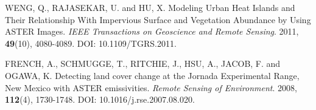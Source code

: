 \begin{thebibliography}{10}
 WENG, Q., RAJASEKAR, U. and HU, X. Modeling Urban Heat Islands and Their Relationship With Impervious Surface and Vegetation Abundance by Using ASTER Images. \textit{IEEE Transactions on Geoscience and Remote Sensing}. 2011, \textbf{49}(10), 4080-4089. DOI: 10.1109/TGRS.2011.

 FRENCH, A., SCHMUGGE, T., RITCHIE, J., HSU, A., JACOB, F. and OGAWA, K. Detecting land cover change at the Jornada Experimental Range, New Mexico with ASTER emissivities. \textit{Remote Sensing of Environment}. 2008, \textbf{112}(4), 1730-1748. DOI: 10.1016/j.rse.2007.08.020.

\end{thebibliography}
